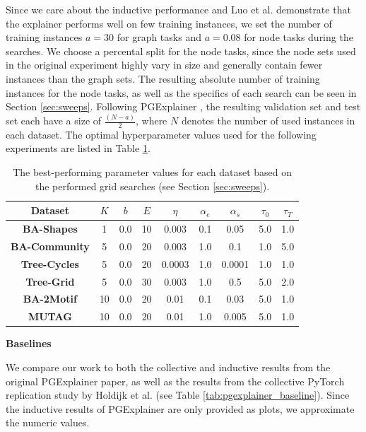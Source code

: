 Since we care about the inductive performance and Luo et al. \cite{luo2020parameterized} demonstrate that the explainer performs well on few training instances, we set the number of training instances $a=30$ for graph tasks and $a=0.08$ for node tasks during the searches. We choose a percental split for the node tasks, since the node sets used in the original experiment highly vary in size and generally contain fewer instances than the graph sets. The resulting absolute number of training instances for the node tasks, as well as the specifics of each search can be seen in Section \ref{sec:sweeps}. Following PGExplainer \cite{luo2020parameterized}, the resulting validation set and test set each have a size of $\frac{(N-a)}{2}$, where $N$ denotes the number of used instances in each dataset. The optimal hyperparameter values used for the following experiments are listed in Table \ref{tab:best_sweep_values}.

\begin{table}[h]
    \centering
    \scriptsize
    \begin{tabular}{|c|c|c|c|c|c|c|c|c|} \hline
    Dataset & $K$ & $b$ & $E$ & $\eta$ & $\alpha_e$ & $\alpha_s$ & $\tau_0$ & $\tau_T$ \\ \hline
    \textbf{BA-Shapes} & 1 & 0.0 & 10 & 0.003 & 0.1 & 0.05 & 5.0 & 1.0 \\ \hline
    \textbf{BA-Community} & 5 & 0.0 & 20 & 0.003 & 1.0 & 0.1 & 1.0 & 5.0 \\ \hline
    \textbf{Tree-Cycles} & 5 & 0.0 & 20 & 0.0003 & 1.0 & 0.0001 & 1.0 & 1.0 \\ \hline
    \textbf{Tree-Grid} & 5 & 0.0 & 30 & 0.003 & 1.0 & 0.5 & 5.0 & 2.0 \\ \hline
    \textbf{BA-2Motif} & 10 & 0.0 & 20 & 0.01 & 0.1 & 0.03 & 5.0 & 1.0 \\ \hline
    \textbf{MUTAG} & 10 & 0.0 & 20 & 0.01 & 1.0 & 0.005 & 5.0 & 1.0 \\ \hline
    \end{tabular}
    \caption[Optimal explainer parameter values for each dataset]{The best-performing parameter values for each dataset based on the performed grid searches (see Section \ref{sec:sweeps}).}
    \label{tab:best_sweep_values}
  \end{table}

 \bigskip

\textbf{Baselines}\par
 We compare our work to both the collective and inductive results from the original PGExplainer paper, as well as the results from the collective PyTorch replication study by Holdijk et al. \cite{holdijk2021re} (see Table \ref{tab:pgexplainer_baseline}). Since the inductive results of PGExplainer are only provided as plots, we approximate the numeric values.

